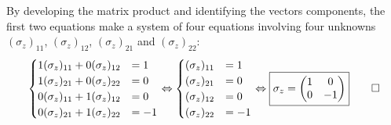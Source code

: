 \documentclass[solutions.tex]{subfiles}
\begin{document}
By developing the matrix product and identifying the vectors
components, the first two equations make a system of four equations
involving four unknowns $(\sigma_z)_{11}$, $(\sigma_z)_{12}$,
$(\sigma_z)_{21}$ and $(\sigma_z)_{22}$:
\begin{equation}
\begin{cases}
	1(\sigma_z)_{11} + 0(\sigma_z)_{12} &= 1 \\
	1(\sigma_z)_{21} + 0(\sigma_z)_{22} &= 0 \\
	0(\sigma_z)_{11} + 1(\sigma_z)_{12} &= 0 \\
	0(\sigma_z)_{21} + 1(\sigma_z)_{22} &= -1 \\
\end{cases} \Leftrightarrow
\begin{cases}
	(\sigma_z)_{11} &= 1 \\
	(\sigma_z)_{21} &= 0 \\
	(\sigma_z)_{12} &= 0 \\
	(\sigma_z)_{22} &= -1 \\
\end{cases} \Leftrightarrow \boxed{\sigma_z = \begin{pmatrix}
	1 & 0 \\
	0 & -1 \\
\end{pmatrix}}\qed
\end{equation}
\end{document}
